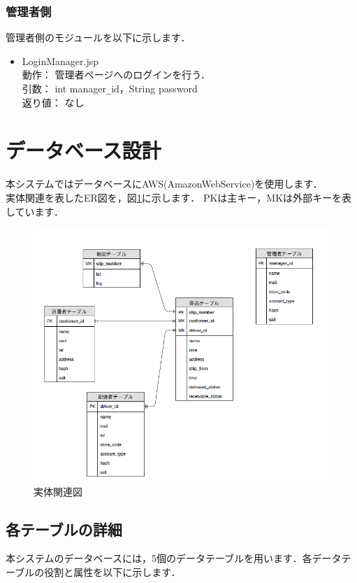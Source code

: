 \documentclass[a4j,titlepage]{jarticle}
\begin{document}
\subsubsection{管理者側}
管理者側のモジュールを以下に示します．
\begin{itemize}
\item LoginManager.jsp\\
  動作： 管理者ページへのログインを行う．\\
  引数： int manager\verb|_|id，String password\\
  返り値： なし
\end{itemize}


\section{データベース設計}
本システムではデータベースにAWS(AmazonWebService)を使用します．\\
実体関連を表したER図を，図\ref{fig:erd}に示します．
PKは主キー，MKは外部キーを表しています．
\begin{figure}[H]
 \begin{center}
  \includegraphics[width=150mm]{erd.png}
  \caption{実体関連図}
  \label{fig:erd}
 \end{center}
\end{figure}
 
\subsection{各テーブルの詳細}
本システムのデータベースには，5個のデータテーブルを用います．各データテーブルの役割と属性を以下に示します．
\end{document}
